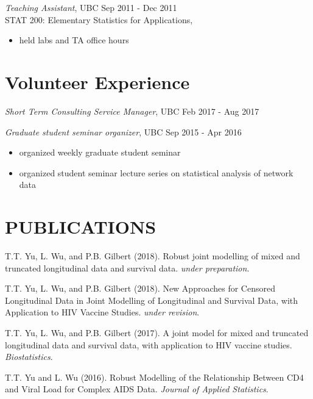 \documentclass[margin]{res}
\begin{document}
\begin{resume}
 {\sl Teaching Assistant}, UBC \hfill Sep 2011 - Dec 2011 \\
                STAT 200: Elementary Statistics for Applications, 
                \begin{itemize} \itemsep -2pt %
                    \item held labs and TA office hours
                \end{itemize}

\section{Volunteer Experience}              

{\sl Short Term Consulting Service Manager}, UBC \hfill Feb 2017 - Aug 2017  


{\sl Graduate student seminar organizer}, UBC \hfill Sep 2015 - Apr 2016
                 \begin{itemize}  \itemsep -2pt %
                  \item organized weekly graduate student seminar
                 \item organized student seminar lecture series on statistical
                 analysis of network data
                \end{itemize}                


\section{PUBLICATIONS} %
T.T. Yu, L. Wu, and P.B. Gilbert (2018). Robust joint modelling of mixed and truncated longitudinal data  and survival data. {\em under preparation}.

T.T. Yu, L. Wu, and P.B. Gilbert (2018). New Approaches for Censored Longitudinal Data in Joint Modelling of Longitudinal and Survival Data, with Application to HIV Vaccine Studies. {\em under revision}.

T.T. Yu, L. Wu, and P.B. Gilbert (2017). A joint model for mixed and truncated longitudinal data and survival data, with application to HIV vaccine studies. {\em Biostatistics}. 

T.T. Yu and L. Wu (2016). Robust Modelling of the Relationship Between CD4 and Viral Load for Complex AIDS Data. {\em Journal of Applied Statistics}.


\end{resume}
\end{document}

